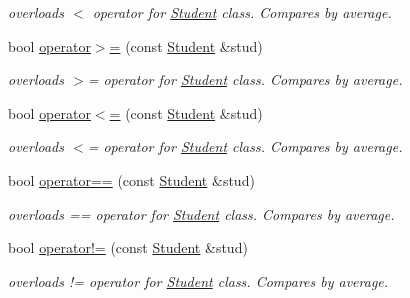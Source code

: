 \begin{DoxyCompactItemize}
\begin{DoxyCompactList}\small\item\em overloads $<$ operator for \mbox{\hyperlink{class_student}{Student}} class. Compares by average. \end{DoxyCompactList}\item 
bool \mbox{\hyperlink{class_student_a39be9cda43dd5af76987a77ab33b21e3}{operator$>$=}} (const \mbox{\hyperlink{class_student}{Student}} \&stud)
\begin{DoxyCompactList}\small\item\em overloads $>$= operator for \mbox{\hyperlink{class_student}{Student}} class. Compares by average. \end{DoxyCompactList}\item 
bool \mbox{\hyperlink{class_student_a26ac75f112a5103217cf31e7bd8d6e9c}{operator$<$=}} (const \mbox{\hyperlink{class_student}{Student}} \&stud)
\begin{DoxyCompactList}\small\item\em overloads $<$= operator for \mbox{\hyperlink{class_student}{Student}} class. Compares by average. \end{DoxyCompactList}\item 
bool \mbox{\hyperlink{class_student_a4023157958bdbdca27935f3ded2b5258}{operator==}} (const \mbox{\hyperlink{class_student}{Student}} \&stud)
\begin{DoxyCompactList}\small\item\em overloads == operator for \mbox{\hyperlink{class_student}{Student}} class. Compares by average. \end{DoxyCompactList}\item 
bool \mbox{\hyperlink{class_student_a58c13f22a8458e3ed6cf0afceebc3e31}{operator!=}} (const \mbox{\hyperlink{class_student}{Student}} \&stud)
\begin{DoxyCompactList}\small\item\em overloads != operator for \mbox{\hyperlink{class_student}{Student}} class. Compares by average. \end{DoxyCompactList}\end{DoxyCompactItemize}
